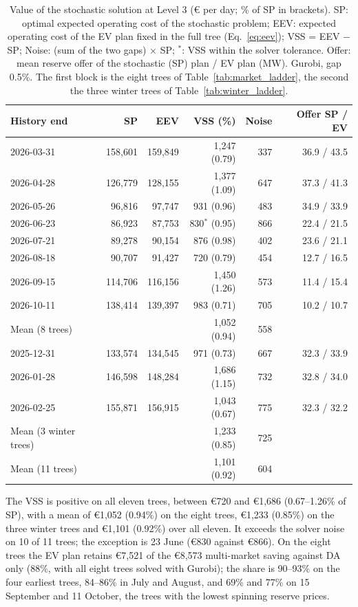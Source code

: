 \documentclass[5p,times,twocolumn]{elsarticle}
\begin{document}
\begin{table}[t]
\caption{Value of the stochastic solution at Level 3 (\euro{} per day; \% of SP in brackets). SP: optimal expected operating cost of the stochastic problem; EEV: expected operating cost of the EV plan fixed in the full tree (Eq.~\eqref{eq:eev}); VSS = EEV $-$ SP; Noise: (sum of the two gaps) $\times$ SP; $^{\ast}$: VSS within the solver tolerance. Offer: mean reserve offer of the stochastic (SP) plan / EV plan (MW). Gurobi, gap 0.5\%. The first block is the eight trees of Table~\ref{tab:market_ladder}, the second the three winter trees of Table~\ref{tab:winter_ladder}.}
\label{tab:vss}
\centering
\scriptsize
\setlength{\tabcolsep}{4pt}
\begin{tabular}{@{}lrrrrr@{}}
\toprule
\textbf{History end} & \textbf{SP} & \textbf{EEV} & \textbf{VSS (\%)} & \textbf{Noise} & \textbf{Offer SP / EV} \\
\midrule
2026-03-31 & 158,601 & 159,849 & 1,247 (0.79) & 337 & 36.9 / 43.5 \\
2026-04-28 & 126,779 & 128,155 & 1,377 (1.09) & 647 & 37.3 / 41.3 \\
2026-05-26 & 96,816 & 97,747 & 931 (0.96) & 483 & 34.9 / 33.9 \\
2026-06-23 & 86,923 & 87,753 & 830$^{\ast}$ (0.95) & 866 & 22.4 / 21.5 \\
2026-07-21 & 89,278 & 90,154 & 876 (0.98) & 402 & 23.6 / 21.1 \\
2026-08-18 & 90,707 & 91,427 & 720 (0.79) & 454 & 12.7 / 16.5 \\
2026-09-15 & 114,706 & 116,156 & 1,450 (1.26) & 573 & 11.4 / 15.4 \\
2026-10-11 & 138,414 & 139,397 & 983 (0.71) & 705 & 10.2 / 10.7 \\
\midrule
Mean (8 trees) & & & 1,052 (0.94) & 558 & \\
\midrule
2025-12-31 & 133,574 & 134,545 & 971 (0.73) & 667 & 32.3 / 33.9 \\
2026-01-28 & 146,598 & 148,284 & 1,686 (1.15) & 732 & 32.8 / 34.0 \\
2026-02-25 & 155,871 & 156,915 & 1,043 (0.67) & 775 & 32.3 / 32.2 \\
\midrule
Mean (3 winter trees) & & & 1,233 (0.85) & 725 & \\
Mean (11 trees) & & & 1,101 (0.92) & 604 & \\
\bottomrule
\end{tabular}
\end{table}

The VSS is positive on all eleven trees, between \euro 720 and \euro 1,686 (0.67--1.26\% of SP), with a mean of \euro 1,052 (0.94\%) on the eight trees, \euro 1,233 (0.85\%) on the three winter trees and \euro 1,101 (0.92\%) over all eleven. It exceeds the solver noise on 10 of 11 trees; the exception is 23 June (\euro 830 against \euro 866). On the eight trees the EV plan retains \euro 7,521 of the \euro 8,573 multi-market saving against DA only (88\%, with all eight trees solved with Gurobi); the share is 90--93\% on the four earliest trees, 84--86\% in July and August, and 69\% and 77\% on 15 September and 11 October, the trees with the lowest spinning reserve prices.
\end{document}
